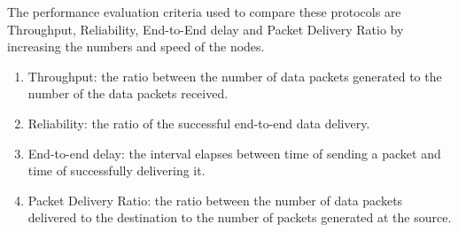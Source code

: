 The performance evaluation criteria used to compare these protocols are Throughput, Reliability, End-to-End delay and Packet Delivery Ratio by increasing the numbers and speed of the nodes. \cite{multicast-survay}

\begin{enumerate}[itemsep=1pt, topsep=5pt]
    \item Throughput: the ratio between the number of data packets generated to the number of the data packets received.
    \item Reliability: the ratio of the successful end-to-end data delivery.
    \item End-to-end delay: the interval elapses between time of sending a packet and time of successfully delivering it.
    \item Packet Delivery Ratio: the ratio between the number of data packets delivered to the destination to the number of packets generated at the source.
\end{enumerate}

